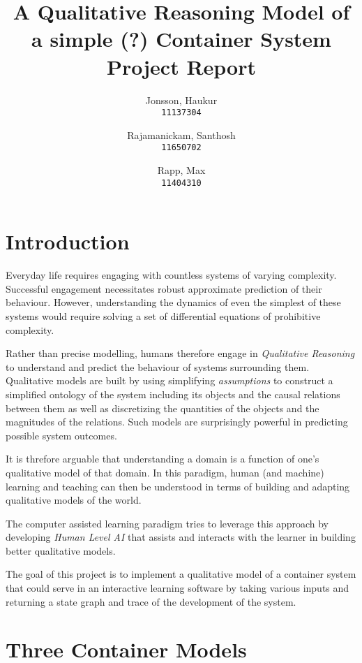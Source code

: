 \documentclass{article}
\begin{document}
\author{
  Jonsson, Haukur\\
  \texttt{11137304}
  \and
  Rajamanickam, Santhosh\\
  \texttt{11650702}
  \and
  Rapp, Max\\
  \texttt{11404310}
}
\title{A Qualitative Reasoning Model of a simple (?) Container System\\
	\large Project Report}
\maketitle



\section{Introduction}

Everyday life requires engaging with countless systems of varying complexity. Successful engagement necessitates robust approximate prediction of their behaviour. However, understanding the dynamics of even the simplest of these systems would require solving a set of differential equations of prohibitive complexity.

Rather than precise modelling, humans therefore engage in \textit{Qualitative Reasoning} to understand and predict the behaviour of systems surrounding them. Qualitative models are built by using simplifying \textit{assumptions} to construct a simplified ontology of the system including its objects and the causal relations between them as well as discretizing the quantities of the objects and the magnitudes of the relations. Such models are surprisingly powerful in predicting possible system outcomes.

It is threfore arguable that understanding a domain is a function of one's qualitative model of that domain. In this paradigm, human (and machine) learning and teaching can then be understood in terms of building and adapting qualitative models of the world. 

The computer assisted learning paradigm tries to leverage this approach by developing \textit{Human Level AI} that assists and interacts with the learner in building better qualitative models.

The goal of this project is to implement a qualitative model of a container system that could serve in an interactive learning software by taking various inputs and returning a state graph and trace of the development of the system.

\section{Three Container Models}
\end{document}
